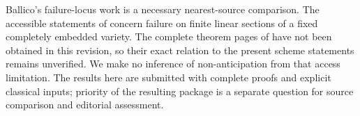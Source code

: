 Ballico's failure-locus work \cite{Ballico93,Ballico96} is a necessary
nearest-source comparison. The accessible statements of
\cite[Theorem 0.2, Proposition 2.2, Remark 2.3]{Ballico96} concern
failure on finite linear sections of a fixed completely embedded
variety. The complete theorem pages of \cite{Ballico93} have not
been obtained in this revision, so their exact relation to the
present scheme statements remains unverified. We make no inference
of non-anticipation from that access limitation. The results here
are submitted with complete proofs and explicit classical inputs;
priority of the resulting package is a separate question for source
comparison and editorial assessment.
